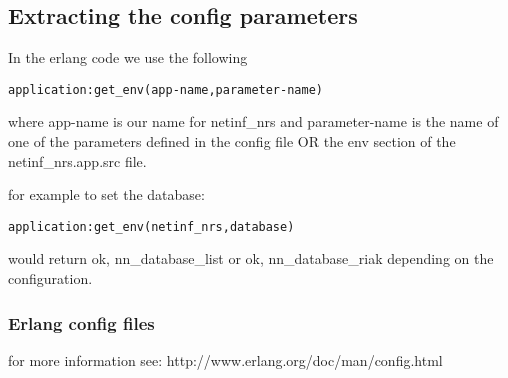 \subsection {Extracting the config parameters}

In the erlang code we use the following 

\begin {verbatim}
application:get_env(app-name,parameter-name) 
\end{verbatim}

where app-name is our name for netinf\_nrs and parameter-name is the name of one of the parameters defined in the config file OR the env section of the netinf\_nrs.app.src file.

for example to set the database:

\begin {verbatim}
application:get_env(netinf_nrs,database) 
\end{verbatim}

would return {ok, nn\_database\_list} or {ok, nn\_database\_riak} depending on the configuration. 


\subsubsection  {Erlang config files}

for more information see: http://www.erlang.org/doc/man/config.html
